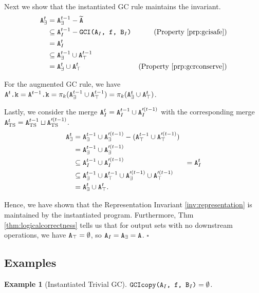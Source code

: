 \documentclass[10pt]{proc}
\numberwithin{equation}{section}
\newtheorem{example}{Example}[section]
\newenvironment{proof}[1][Proof]{\begin{trivlist}\item[\hskip \labelsep {\textit {#1:}}]}{\end{trivlist}}
\renewcommand{\tt}[1]{\ifmmode\text{\texttt{#1}}\else\texttt{#1}\fi}
\begin{document}
\begin{proof}
Next we show that the instantiated GC rule maintains the invariant.
\begin{align*}
\tt{A}_\exists^t 
&= \tt{A}_\exists^{t-1} - \widetilde{\tt{A}}\\
&\subseteq \tt{A}_I^{t-1} - \tt{GCI(A$_I$, f, B$_I$)} & \text{(Property \ref{prp:gcisafe})}\\
&= \tt{A}_I^t\\
&\subseteq \tt{A}_\exists^{t-1} \cup \tt{A}_\top^{t-1}\\
&= \tt{A}_\exists^t \cup \tt{A}_\top^t & \text{(Property \ref{prp:gcrconserve})}
\end{align*}

For the augmented GC rule, we have $\tt{A}^t\tt{.k} = \tt{A}^{t-1}\tt{.k} = \pi_k(\tt{A}^{t-1}_\exists \cup \tt{A}^{t-1}_\top) = \pi_k(\tt{A}^t_\exists \cup \tt{A}^t_\top)$.

Lastly, we consider the merge $\tt{A}_I^t = \tt{A}_I^{t-1} \cup \tt{A}_I^{\prime(t-1)}$ with the corresponding merge $\tt{A}_\text{TS}^t = \tt{A}_\text{TS}^{t-1} \sqcup \tt{A}_\text{TS}^{\prime(t-1)}$.
\begin{align*}
\tt{A}_\exists^t
&= \tt{A}_\exists^{t-1} \cup \tt{A}_\exists^{\prime(t-1)} - (\tt{A}_\top^{t-1} \cup \tt{A}_\top^{\prime(t-1)})\\
&= \tt{A}_\exists^{t-1} \cup \tt{A}_\exists^{\prime(t-1)}\\
&\subseteq \tt{A}_I^{t-1} \cup \tt{A}_I^{\prime(t-1)}
&= \tt{A}_I^t\\
&\subseteq \tt{A}_\exists^{t-1} \cup \tt{A}_\top^{t-1} \cup \tt{A}_\exists^{\prime(t-1)} \cup \tt{A}_\top^{\prime(t-1)}\\
&= \tt{A}_\exists^t \cup \tt{A}_\top^t.
\end{align*}

Hence, we have shown that the Representation Invariant \ref{inv:representation} is maintained by the instantiated program.
Furthermore, Thm \ref{thm:logicalcorrectness} tells us that for output sets with no downstream operations, we have $\tt{A}_\top = \emptyset$, so $\tt{A}_I = \tt{A}_\exists = \tt{A}$.
$\square$
\end{proof}

\subsection{Examples}
\begin{example}[Instantiated Trivial GC]
$\tt{GCIcopy(A$_I$, f, B$_I$)} = \emptyset$.
\end{example}
\end{document}
